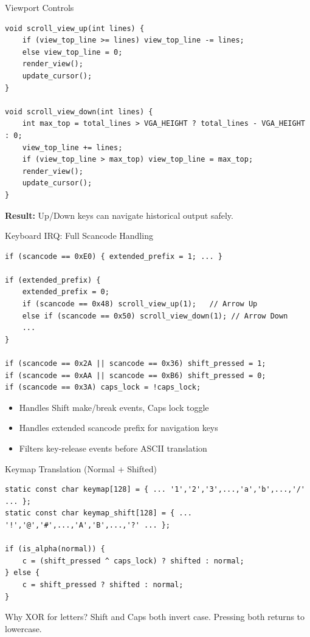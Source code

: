 \documentclass[aspectratio=169]{beamer}
\newcommand{\concept}[2]{%
  \begin{block}{#1}\smallskip #2\smallskip\end{block}\vspace{5pt}}
\begin{document}
\begin{frame}[fragile]{Viewport Controls}
  \begin{lstlisting}[style=clang]
void scroll_view_up(int lines) {
    if (view_top_line >= lines) view_top_line -= lines;
    else view_top_line = 0;
    render_view();
    update_cursor();
}

void scroll_view_down(int lines) {
    int max_top = total_lines > VGA_HEIGHT ? total_lines - VGA_HEIGHT : 0;
    view_top_line += lines;
    if (view_top_line > max_top) view_top_line = max_top;
    render_view();
    update_cursor();
}
  \end{lstlisting}
  \textbf{Result:} Up/Down keys can navigate historical output safely.
\end{frame}

\begin{frame}[fragile]{Keyboard IRQ: Full Scancode Handling}
  \begin{lstlisting}[style=clang]
if (scancode == 0xE0) { extended_prefix = 1; ... }

if (extended_prefix) {
    extended_prefix = 0;
    if (scancode == 0x48) scroll_view_up(1);   // Arrow Up
    else if (scancode == 0x50) scroll_view_down(1); // Arrow Down
    ...
}

if (scancode == 0x2A || scancode == 0x36) shift_pressed = 1;
if (scancode == 0xAA || scancode == 0xB6) shift_pressed = 0;
if (scancode == 0x3A) caps_lock = !caps_lock;
  \end{lstlisting}
  \begin{itemize}
    \item Handles Shift make/break events, Caps lock toggle
    \item Handles extended scancode prefix for navigation keys
    \item Filters key-release events before ASCII translation
  \end{itemize}
\end{frame}

\begin{frame}[fragile]{Keymap Translation (Normal + Shifted)}
  \begin{lstlisting}[style=clang]
static const char keymap[128] = { ... '1','2','3',...,'a','b',...,'/' ... };
static const char keymap_shift[128] = { ... '!','@','#',...,'A','B',...,'?' ... };

if (is_alpha(normal)) {
    c = (shift_pressed ^ caps_lock) ? shifted : normal;
} else {
    c = shift_pressed ? shifted : normal;
}
  \end{lstlisting}
  \concept{Why XOR for letters?}{
    Shift and Caps both invert case. Pressing both returns to lowercase.
  }
\end{frame}
\end{document}
